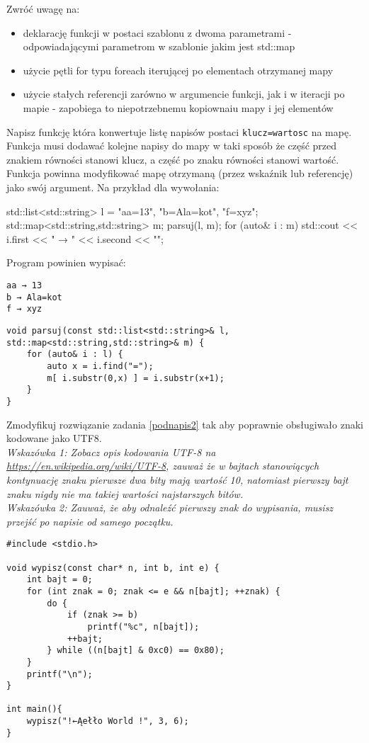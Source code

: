 \noindent Zwróć uwagę na:
\begin{itemize}
\item deklarację funkcji w postaci szablonu z dwoma parametrami - odpowiadającymi parametrom w szablonie jakim jest std::map
\item użycie pętli for typu foreach iterującej po elementach otrzymanej mapy
\item użycie stałych referencji zarówno w argumencie funkcji, jak i w iteracji po mapie - zapobiega to niepotrzebnemu kopiownaiu mapy i jej elementów
\end{itemize}
\fi


\dbEntryCheckResults
Napisz funkcję która konwertuje listę napisów postaci \Verb#klucz=wartosc# na mapę.
Funkcja musi dodawać kolejne napisy do mapy w taki sposób że część przed znakiem równości stanowi klucz, a część po znaku równości stanowi wartość.
Funkcja powinna modyfikować mapę otrzymaną (przez wskaźnik lub referencję) jako swój argument. Na przykład dla wywołania:
\begin{CodeFrame*}[cpp]{}
std::list<std::string> l = {"aa=13", "b=Ala=kot", "f=xyz"};
std::map<std::string,std::string> m;
parsuj(l, m);
for (auto& i : m)  std::cout << i.first << " → " << i.second << "\n";
\end{CodeFrame*}
\vspace{-8pt}Program powinien wypisać:
\vspace{-8pt}\begin{Verbatim}
aa → 13
b → Ala=kot
f → xyz
\end{Verbatim}
\fi

\dbEntryCheckResults
\begin{verbatim}
void parsuj(const std::list<std::string>& l, std::map<std::string,std::string>& m) {
	for (auto& i : l) {
		auto x = i.find("=");
		m[ i.substr(0,x) ] = i.substr(x+1);
	}
}
\end{verbatim}
\fi


\dbEntryCheckResults
Zmodyfikuj rozwiązanie zadania \ref{podnapis2} tak aby poprawnie obsługiwało znaki kodowane jako UTF8.
\\ \textit{
	Wskazówka 1: Zobacz opis kodowania UTF-8 na \url{https://en.wikipedia.org/wiki/UTF-8},
	zauważ że w bajtach stanowiących kontynuację znaku pierwsze dwa bity mają wartość 10,
	natomiast pierwszy bajt znaku nigdy nie ma takiej wartości najstarszych bitów.}
\\ \textit{
	Wskazówka 2: Zauważ, że aby odnaleźć pierwszy znak do wypisania, musisz przejść po napisie od samego początku.}
\fi

\dbEntryCheckResults
\begin{verbatim}
#include <stdio.h>

void wypisz(const char* n, int b, int e) {
	int bajt = 0;
	for (int znak = 0; znak <= e && n[bajt]; ++znak) {
		do {
			if (znak >= b)
				printf("%c", n[bajt]);
			++bajt;
		} while ((n[bajt] & 0xc0) == 0x80);
	}
	printf("\n");
}

int main(){
	wypisz("!←Ąełło World !", 3, 6);
}
\end{verbatim}
\fi
